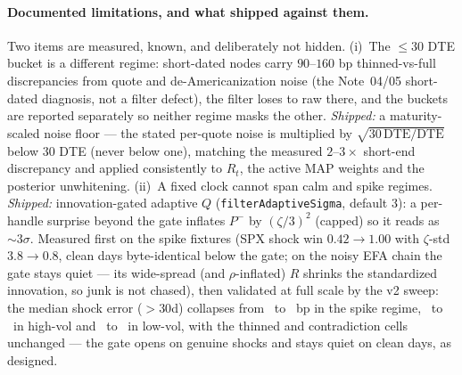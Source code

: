 \documentclass[11pt]{article}
\begin{document}
\paragraph{Documented limitations, and what shipped against them.} Two items
are measured, known, and deliberately not hidden. (i)~The $\le30$ DTE bucket
is a different regime: short-dated nodes carry $90$--$160$ bp thinned-vs-full
discrepancies from quote and de-Americanization noise (the Note~04/05
short-dated diagnosis, not a filter defect), the filter loses to raw there,
and the buckets are reported separately so neither regime masks the other.
\emph{Shipped:} a maturity-scaled noise floor --- the stated per-quote noise
is multiplied by $\sqrt{30\,\mathrm{DTE}/\mathrm{DTE}}$ below $30$ DTE (never
below one), matching the measured $2$--$3\times$ short-end discrepancy and
applied consistently to $R_t$, the active MAP weights and the posterior
unwhitening. (ii)~A fixed clock cannot span calm and spike regimes.
\emph{Shipped:} innovation-gated adaptive $Q$
(\texttt{filterAdaptiveSigma}, default $3$): a per-handle surprise beyond the
gate inflates $P^-$ by $(\zeta/3)^2$ (capped) so it reads as ${\sim}3\sigma$.
Measured first on the spike fixtures (SPX shock win $0.42\to1.00$ with
$\zeta$-std $3.8\to0.8$, clean days byte-identical below the gate; on the
noisy EFA chain the gate stays quiet --- its wide-spread (and
$\rho$-inflated) $R$ shrinks the standardized innovation, so junk is not
chased), then validated at full scale by the v2 sweep: the median shock
error ($>30$d) collapses from \KalShockJacSpike\ to \KalOvlShockSpike\ bp in
the spike regime, \KalShockJacHigh\ to \KalOvlShockHigh\ in high-vol and
\KalShockJacLow\ to \KalOvlShockLow\ in low-vol, with the thinned and
contradiction cells unchanged --- the gate opens on genuine shocks and stays
quiet on clean days, as designed.
\end{document}
